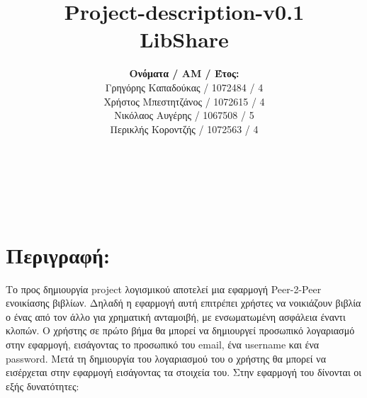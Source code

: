 \documentclass[12pt,a4paper]{article}
\title{Project-description-v0.1 \\ LibShare}
\author{\textbf{Ονόματα / ΑΜ / Έτος:} \\ Γρηγόρης Καπαδούκας / 1072484 / 4\textdegree \\ Χρήστος Μπεστητζάνος / 1072615 / 4\textdegree \\ Νικόλαος Αυγέρης / 1067508 / 5\textdegree \\ Περικλής Κοροντζής / 1072563 / 4\textdegree}
\begin{document}
\makeatletter
\begin{center}
	\LARGE{\@title} \\
	\pagebreak
	\begin{LARGE}\@author\end{LARGE} \\
\end{center}
\pagebreak

\section{Περιγραφή:}
Το προς δημιουργία project λογισμικού αποτελεί μια εφαρμογή Peer-2-Peer ενοικίασης βιβλίων. Δηλαδή η εφαρμογή αυτή επιτρέπει χρήστες να νοικιάζουν βιβλία ο ένας από τον άλλο για χρηματική ανταμοιβή, με ενσωματωμένη ασφάλεια έναντι κλοπών. Ο χρήστης σε πρώτο βήμα θα μπορεί να δημιουργεί προσωπικό λογαριασμό στην εφαρμογή, εισάγοντας το προσωπικό του email, ένα username και ένα password. Μετά τη δημιουργία του λογαριασμού του ο χρήστης θα μπορεί να εισέρχεται στην εφαρμογή εισάγοντας τα στοιχεία του. Στην εφαρμογή του δίνονται οι εξής δυνατότητες:
\end{document}
